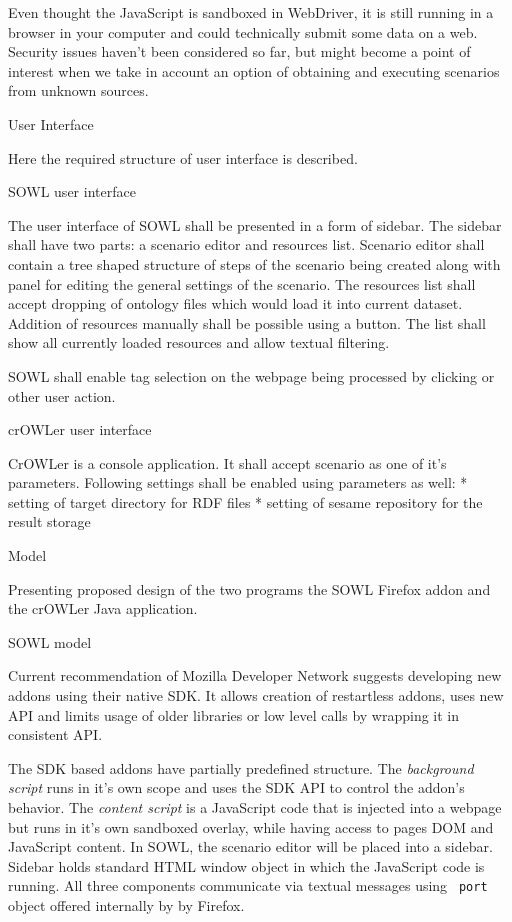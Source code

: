 Even thought the JavaScript is sandboxed in WebDriver, it is still running in a
browser in your computer and could technically submit some data on a web.
Security issues haven't been considered so far, but might become a point of
interest when we take in account an option of obtaining and executing scenarios
from unknown sources. 


\sec User Interface

Here the required structure of user interface is described. 

\secc SOWL user interface

The user interface of SOWL shall be presented in a form of sidebar. The sidebar
shall have two parts: a scenario editor and resources list. Scenario editor
shall contain a tree shaped structure of steps of the scenario being created
along with panel for editing the general settings of the scenario. The
resources list shall accept dropping of ontology files which would load it into
current dataset. Addition of resources manually shall be possible using a
button. The list shall show all currently loaded resources and allow textual
filtering. 

SOWL shall enable tag selection on the webpage being processed by clicking or
other user action. 


\secc crOWLer user interface

CrOWLer is a console application. It shall accept scenario as one of it's parameters. 
Following settings shall be enabled using parameters as well:
\begitems
  * setting of target directory for RDF files
  * setting of sesame repository for the result storage
\enditems


\sec Model

Presenting proposed design of the two programs the SOWL Firefox addon and the
crOWLer Java application. 

\secc SOWL model

Current recommendation of Mozilla Developer Network suggests developing new
addons using their native SDK. It allows creation of restartless addons, uses 
new API and limits usage of older libraries or low level calls by wrapping it 
in consistent API. 

The SDK based addons have partially predefined structure. The {\em background script}
runs in it's own scope and uses the SDK API to control the addon's behavior.
The {\em content script} is a JavaScript code that is injected into a webpage
but runs in it's own sandboxed overlay, while having access to pages DOM and
JavaScript content. In SOWL, the scenario editor will be placed into a sidebar.
Sidebar holds standard HTML window object in which the JavaScript code is
running.  All three components communicate via textual messages using {\tt
port} object offered internally by by Firefox. 

